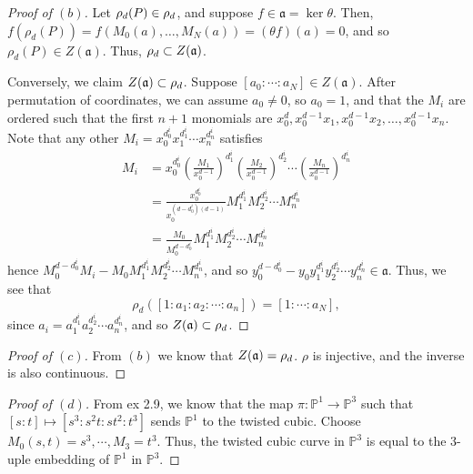 \documentclass[12pt,letterpaper]{article}
\theoremstyle{definition}
\theoremstyle{remark}
\numberwithin{equation}{section}
\numberwithin{figure}{problem}
\let\Im\relax
\DeclareMathOperator{\Im}{im}
\DeclareMathOperator{\Ker}{Ker}
\newcommand{\PP}{\mathbb{P}}
\begin{document}
\begin{proof}[Proof of $(b)$]
  Let $\rho_d(P) \in \Im \rho_d$, and suppose $f \in \mathfrak{a} = \ker\theta$.
  Then, $f(\rho_d(P)) = f(M_0(a), \ldots, M_N(a)) = (\theta f)(a) = 0$, and so
  $\rho_d(P) \in Z(\mathfrak{a})$. Thus, $\Im \rho_d \subset Z(\mathfrak{a})$. 
  \par Conversely, we claim $Z(\mathfrak{a}) \subset \Im \rho_d$. Suppose
  $[a_0:\cdots:a_N] \in Z(\mathfrak{a})$. After permutation of coordinates, we
  can assume $a_0 \ne 0$, so $a_0 = 1$, and that the $M_i$ are ordered such that
  the first $n+1$ monomials are
  $x_0^d,x_0^{d-1}x_1,x_0^{d-1}x_2,\ldots,x_0^{d-1}x_n$. Note that any other
  $M_i = x_0^{d^i_0}x_1^{d^i_1}\cdots x_n^{d^i_n}$ satisfies
  \begin{align*}
    M_i &= x_0^{d^i_0} \left(\frac{M_1}{x_0^{d-1}}\right)^{d^i_1}
    \left(\frac{M_2}{x_0^{d-1}}\right)^{d^i_2} \cdots
    \left(\frac{M_n}{x_0^{d-1}}\right)^{d^i_n}\\
    &= \frac{x_0^{d^i_0}}{x_0^{(d-d^i_0)(d-1)}}M_1^{d^i_1}M_2^{d^i_2}\cdots
    M_n^{d^i_n}\\
    &= \frac{M_0}{M_0^{d-d^i_0}} M_1^{d^i_1}M_2^{d^i_2}\cdots M_n^{d^i_n}
  \end{align*}
  hence $M_0^{d-d^i_0}M_i - M_0M_1^{d^i_1}M_2^{d^i_2}\cdots M_n^{d^i_n}$, and so
  $y_0^{d-d^i_0} - y_0y_1^{d^i_1}y_2^{d^i_2}\cdots y_n^{d^i_n} \in \mathfrak{a}$.
  Thus, we see that
  \begin{equation*}
    \rho_d([1 : a_1 : a_2 : \cdots : a_n]) = [1 : \cdots : a_N],
  \end{equation*}
  since $a_i = a_1^{d^i_1}a_2^{d^i_2}\cdots a_n^{d^i_n}$,
  and so $Z(\mathfrak{a}) \subset \Im \rho_d$.
\end{proof}
\begin{proof}[Proof of $(c)$]
  From $(b)$ we know that $Z(\mathfrak{a}) = \Im \rho_d$. $\rho$ is injective, and the inverse is also continuous.  
\end{proof}
\begin{proof}[Proof of $(d)$]
  From ex 2.9, we know that the map $\pi: \PP^1 \to \PP^3$ such that $[s:t] \mapsto [s^3: s^2t: st^2: t^3]$ sends $\PP^1$ to the twisted cubic. Choose $M_0(s,t) = s^3, \cdots, M_3 = t^3$. Thus, the twisted cubic curve in $\PP^3$ is equal to the $3$-uple embedding of $\PP^1$ in $\PP^3$. 
\end{proof}
\end{document}
